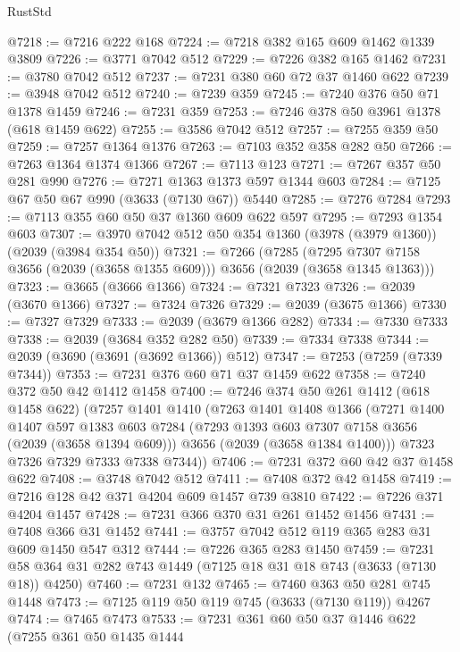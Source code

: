 \begin{lexlean}{RustStd}
\begin{coremodule}
@7218 := @7216 @222 @168
@7224 := @7218 @382 @165 @609 @1462 @1339 @3809
@7226 := @3771 @7042 @512
@7229 := @7226 @382 @165 @1462
@7231 := @3780 @7042 @512
@7237 := @7231 @380 @60 @72 @37 @1460 @622
@7239 := @3948 @7042 @512
@7240 := @7239 @359
@7245 := @7240 @376 @50 @71 @1378 @1459
@7246 := @7231 @359
@7253 := @7246 @378 @50 @3961 @1378 (@618 @1459 @622)
@7255 := @3586 @7042 @512
@7257 := @7255 @359 @50
@7259 := @7257 @1364 @1376
@7263 := @7103 @352 @358 @282 @50
@7266 := @7263 @1364 @1374 @1366
@7267 := @7113 @123
@7271 := @7267 @357 @50 @281 @990
@7276 := @7271 @1363 @1373 @597 @1344 @603
@7284 := @7125 @67 @50 @67 @990 (@3633 (@7130 @67)) @5440
@7285 := @7276 @7284
@7293 := @7113 @355 @60 @50 @37 @1360 @609 @622 @597
@7295 := @7293 @1354 @603
@7307 := @3970 @7042 @512 @50 @354 @1360 (@3978 (@3979 @1360)) (@2039 (@3984 @354 @50))
@7321 := @7266
    (@7285 (@7295 @7307 @7158 @3656 (@2039 (@3658 @1355 @609))) @3656 (@2039 (@3658 @1345 @1363)))
@7323 := @3665 (@3666 @1366)
@7324 := @7321 @7323
@7326 := @2039 (@3670 @1366)
@7327 := @7324 @7326
@7329 := @2039 (@3675 @1366)
@7330 := @7327 @7329
@7333 := @2039 (@3679 @1366 @282)
@7334 := @7330 @7333
@7338 := @2039 (@3684 @352 @282 @50)
@7339 := @7334 @7338
@7344 := @2039 (@3690 (@3691 (@3692 @1366)) @512)
@7347 := @7253 (@7259 (@7339 @7344))
@7353 := @7231 @376 @60 @71 @37 @1459 @622
@7358 := @7240 @372 @50 @42 @1412 @1458
@7400 := @7246
    @374
    @50
    @261
    @1412
    (@618 @1458 @622)
    (@7257
      @1401
      @1410
      (@7263
        @1401
        @1408
        @1366
        (@7271
          @1400
          @1407
          @597
          @1383
          @603
          @7284
          (@7293 @1393 @603 @7307 @7158 @3656 (@2039 (@3658 @1394 @609)))
          @3656
          (@2039 (@3658 @1384 @1400)))
        @7323
        @7326
        @7329
        @7333
        @7338
        @7344))
@7406 := @7231 @372 @60 @42 @37 @1458 @622
@7408 := @3748 @7042 @512
@7411 := @7408 @372 @42 @1458
@7419 := @7216 @128 @42 @371 @4204 @609 @1457 @739 @3810
@7422 := @7226 @371 @4204 @1457
@7428 := @7231 @366 @370 @31 @261 @1452 @1456
@7431 := @7408 @366 @31 @1452
@7441 := @3757 @7042 @512 @119 @365 @283 @31 @609 @1450 @547 @312
@7444 := @7226 @365 @283 @1450
@7459 := @7231 @58 @364 @31 @282 @743 @1449 (@7125 @18 @31 @18 @743 (@3633 (@7130 @18)) @4250)
@7460 := @7231 @132
@7465 := @7460 @363 @50 @281 @745 @1448
@7473 := @7125 @119 @50 @119 @745 (@3633 (@7130 @119)) @4267
@7474 := @7465 @7473
@7533 := @7231
    @361
    @60
    @50
    @37
    @1446
    @622
    (@7255
      @361
      @50
      @1435
      @1444

\end{coremodule}
\end{lexlean}
